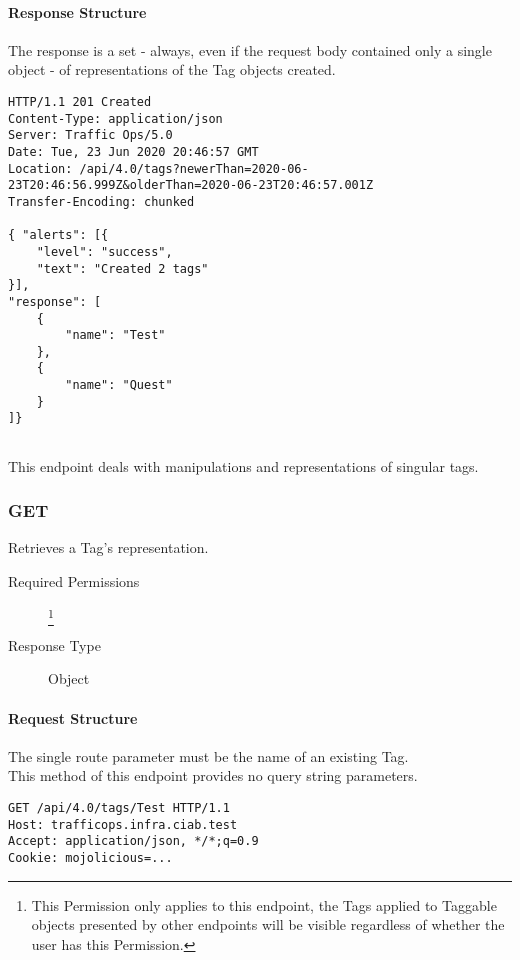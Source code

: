 \paragraph{Response Structure}
The response is a set - always, even if the request body contained only a single
object - of representations of the Tag objects created.

\begin{codelisting}
\begin{verbatim}
HTTP/1.1 201 Created
Content-Type: application/json
Server: Traffic Ops/5.0
Date: Tue, 23 Jun 2020 20:46:57 GMT
Location: /api/4.0/tags?newerThan=2020-06-23T20:46:56.999Z&olderThan=2020-06-23T20:46:57.001Z
Transfer-Encoding: chunked

{ "alerts": [{
	"level": "success",
	"text": "Created 2 tags"
}],
"response": [
	{
		"name": "Test"
	},
	{
		"name": "Quest"
	}
]}
\end{verbatim}
\end{codelisting}


\subsection{}
This endpoint deals with manipulations and representations of singular tags.

\subsubsection{GET}
Retrieves a Tag's representation.
\begin{description}
	\item[Required Permissions] \footnote{This Permission only
	applies to this endpoint, the Tags applied to Taggable objects presented by
	other endpoints will be visible regardless of whether the user has this
	Permission.}
	\item[Response Type] Object
\end{description}

\paragraph{Request Structure}
The single route parameter  must be the name of an existing
Tag.\\
This method of this endpoint provides no query string parameters.

\begin{codelisting}
\begin{verbatim}
GET /api/4.0/tags/Test HTTP/1.1
Host: trafficops.infra.ciab.test
Accept: application/json, */*;q=0.9
Cookie: mojolicious=...

\end{verbatim}
\end{codelisting}

